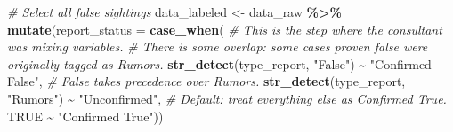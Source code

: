 \documentclass[
]{article}
\newenvironment{Shaded}{\begin{snugshade}}{\end{snugshade}}
\newcommand{\AttributeTok}[1]{\textcolor[rgb]{0.13,0.29,0.53}{#1}}
\newcommand{\CommentTok}[1]{\textcolor[rgb]{0.56,0.35,0.01}{\textit{#1}}}
\newcommand{\ConstantTok}[1]{\textcolor[rgb]{0.56,0.35,0.01}{#1}}
\newcommand{\FunctionTok}[1]{\textcolor[rgb]{0.13,0.29,0.53}{\textbf{#1}}}
\newcommand{\NormalTok}[1]{#1}
\newcommand{\OtherTok}[1]{\textcolor[rgb]{0.56,0.35,0.01}{#1}}
\newcommand{\SpecialCharTok}[1]{\textcolor[rgb]{0.81,0.36,0.00}{\textbf{#1}}}
\newcommand{\StringTok}[1]{\textcolor[rgb]{0.31,0.60,0.02}{#1}}
\begin{document}
\begin{Shaded}
\begin{Highlighting}[]
\CommentTok{\# Select all false sightings }
\NormalTok{data\_labeled }\OtherTok{\textless{}{-}}\NormalTok{ data\_raw }\SpecialCharTok{\%\textgreater{}\%}
  \FunctionTok{mutate}\NormalTok{(}\AttributeTok{report\_status =} \FunctionTok{case\_when}\NormalTok{(}
    \CommentTok{\# This is the step where the consultant was mixing variables.}
    \CommentTok{\# There is some overlap: some cases proven false were originally tagged as Rumors.}
    \FunctionTok{str\_detect}\NormalTok{(type\_report, }\StringTok{"False"}\NormalTok{) }\SpecialCharTok{\textasciitilde{}} \StringTok{"Confirmed False"}\NormalTok{,}
    \CommentTok{\# \textquotesingle{}False\textquotesingle{} takes precedence over \textquotesingle{}Rumors\textquotesingle{}.}
    \FunctionTok{str\_detect}\NormalTok{(type\_report, }\StringTok{"Rumors"}\NormalTok{) }\SpecialCharTok{\textasciitilde{}} \StringTok{"Unconfirmed"}\NormalTok{,}
    \CommentTok{\# Default: treat everything else as Confirmed True.}
    \ConstantTok{TRUE} \SpecialCharTok{\textasciitilde{}} \StringTok{"Confirmed True"}\NormalTok{)) }



\end{Highlighting}
\end{Shaded}
\end{document}
